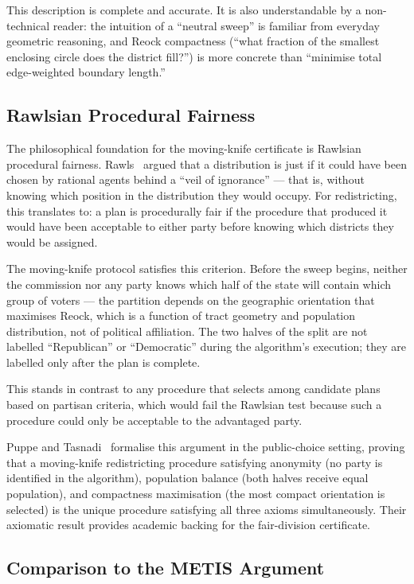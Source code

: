 This description is complete and accurate.
It is also understandable by a non-technical reader: the intuition of a
``neutral sweep'' is familiar from everyday geometric reasoning, and
Reock compactness (``what fraction of the smallest enclosing circle does
the district fill?'') is more concrete than ``minimise total edge-weighted
boundary length.''

\subsection{Rawlsian Procedural Fairness}

The philosophical foundation for the moving-knife certificate is Rawlsian
procedural fairness.
Rawls~\citeyear{rawls1971} argued that a distribution is just if it could
have been chosen by rational agents behind a ``veil of ignorance'' --- that
is, without knowing which position in the distribution they would occupy.
For redistricting, this translates to: a plan is procedurally fair if the
procedure that produced it would have been acceptable to either party before
knowing which districts they would be assigned.

The moving-knife protocol satisfies this criterion.
Before the sweep begins, neither the commission nor any party knows which
half of the state will contain which group of voters --- the partition depends
on the geographic orientation that maximises Reock, which is a function of
tract geometry and population distribution, not of political affiliation.
The two halves of the split are not labelled ``Republican'' or ``Democratic''
during the algorithm's execution; they are labelled only after the plan is
complete.

This stands in contrast to any procedure that selects among candidate plans
based on partisan criteria, which would fail the Rawlsian test because such
a procedure could only be acceptable to the advantaged party.

Puppe and Tasnadi~\citeyear{puppe2026} formalise this argument in the
public-choice setting, proving that a moving-knife redistricting procedure
satisfying anonymity (no party is identified in the algorithm), population
balance (both halves receive equal population), and compactness maximisation
(the most compact orientation is selected) is the unique procedure satisfying
all three axioms simultaneously.
Their axiomatic result provides academic backing for the fair-division
certificate.

\subsection{Comparison to the METIS Argument}

